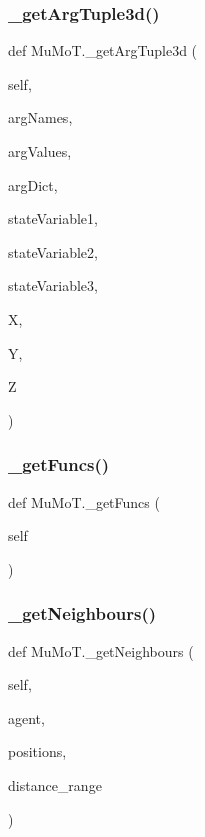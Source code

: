 \subsubsection{\texorpdfstring{\+\_\+get\+Arg\+Tuple3d()}{\_getArgTuple3d()}}
{\footnotesize\ttfamily def Mu\+Mo\+T.\+\_\+get\+Arg\+Tuple3d (\begin{DoxyParamCaption}\item[{}]{self,  }\item[{}]{arg\+Names,  }\item[{}]{arg\+Values,  }\item[{}]{arg\+Dict,  }\item[{}]{state\+Variable1,  }\item[{}]{state\+Variable2,  }\item[{}]{state\+Variable3,  }\item[{}]{X,  }\item[{}]{Y,  }\item[{}]{Z }\end{DoxyParamCaption})\hspace{0.3cm}{\ttfamily [private]}}

\mbox{\label{namespace_mu_mo_t_a20845a319b4faca69e7803e37456d0c2}} 
\subsubsection{\texorpdfstring{\+\_\+get\+Funcs()}{\_getFuncs()}}
{\footnotesize\ttfamily def Mu\+Mo\+T.\+\_\+get\+Funcs (\begin{DoxyParamCaption}\item[{}]{self }\end{DoxyParamCaption})\hspace{0.3cm}{\ttfamily [private]}}

\mbox{\label{namespace_mu_mo_t_abedf54d8c23705e6c9bf2ed5bdda0559}} 
\subsubsection{\texorpdfstring{\+\_\+get\+Neighbours()}{\_getNeighbours()}}
{\footnotesize\ttfamily def Mu\+Mo\+T.\+\_\+get\+Neighbours (\begin{DoxyParamCaption}\item[{}]{self,  }\item[{}]{agent,  }\item[{}]{positions,  }\item[{}]{distance\+\_\+range }\end{DoxyParamCaption})\hspace{0.3cm}{\ttfamily [private]}}

